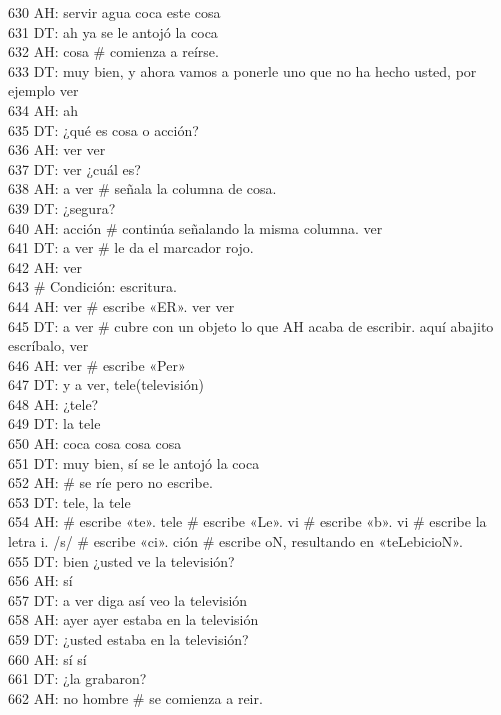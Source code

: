 630 AH: servir agua coca este cosa\\
631 DT: ah ya se le antojó la coca\\
632 AH: cosa \# comienza a reírse.\\
633 DT: muy bien, y ahora vamos a ponerle uno que no ha hecho usted, por ejemplo ver\\
634 AH: ah\\
635 DT: ¿qué es cosa o acción?\\
636 AH: ver ver\\
637 DT: ver ¿cuál es?\\
638 AH: a ver \# señala la columna de cosa.\\
639 DT: ¿segura?\\
640 AH: acción \# continúa señalando la misma columna. ver\\
641 DT: a ver \# le da el marcador rojo.\\
642 AH: ver\\
643 \# Condición: escritura.\\
644 AH: ver \# escribe «ER». ver ver \\
645 DT: a ver \# cubre con un objeto lo que AH acaba de escribir. aquí abajito escríbalo, ver\\
646 AH: ver \# escribe «Per»\\
647 DT: y a ver, tele(televisión)\\
648 AH: ¿tele?\\
649 DT: la tele\\
650 AH: coca cosa cosa cosa\\
651 DT: muy bien, sí se le antojó la coca\\
652 AH: \# se ríe pero no escribe.\\
653 DT: tele, la tele\\
654 AH: \# escribe «te». tele \# escribe «Le». vi \# escribe «b». vi \# escribe la letra i. /s/ \# escribe «ci». ción \# escribe oN, resultando en «teLebicioN».\\
655 DT: bien ¿usted ve la televisión?\\
656 AH: sí\\
657 DT: a ver diga así veo la televisión\\
658 AH: ayer ayer estaba en la televisión\\
659 DT: ¿usted estaba en la televisión?\\
660 AH: sí sí\\
661 DT: ¿la grabaron?\\
662 AH: no hombre \# se comienza a reir.\\
